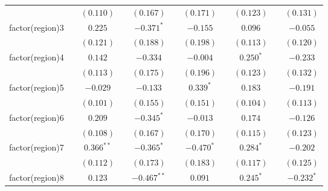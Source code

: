 \begin{tabular}{l c c c c c c c c c c}
                   &                & $(0.110)$      &                & $(0.167)$      &                & $(0.171)$      &                & $(0.123)$      &                & $(0.131)$      \\
factor(region)3    &                & $0.225$        &                & $-0.371^{*}$   &                & $-0.155$       &                & $0.096$        &                & $-0.055$       \\
                   &                & $(0.121)$      &                & $(0.188)$      &                & $(0.198)$      &                & $(0.113)$      &                & $(0.120)$      \\
factor(region)4    &                & $0.142$        &                & $-0.334$       &                & $-0.004$       &                & $0.250^{*}$    &                & $-0.233$       \\
                   &                & $(0.113)$      &                & $(0.175)$      &                & $(0.196)$      &                & $(0.123)$      &                & $(0.132)$      \\
factor(region)5    &                & $-0.029$       &                & $-0.133$       &                & $0.339^{*}$    &                & $0.183$        &                & $-0.191$       \\
                   &                & $(0.101)$      &                & $(0.155)$      &                & $(0.151)$      &                & $(0.104)$      &                & $(0.113)$      \\
factor(region)6    &                & $0.209$        &                & $-0.345^{*}$   &                & $-0.013$       &                & $0.174$        &                & $-0.126$       \\
                   &                & $(0.108)$      &                & $(0.167)$      &                & $(0.170)$      &                & $(0.115)$      &                & $(0.123)$      \\
factor(region)7    &                & $0.366^{**}$   &                & $-0.365^{*}$   &                & $-0.470^{*}$   &                & $0.284^{*}$    &                & $-0.202$       \\
                   &                & $(0.112)$      &                & $(0.173)$      &                & $(0.183)$      &                & $(0.117)$      &                & $(0.125)$      \\
factor(region)8    &                & $0.123$        &                & $-0.467^{**}$  &                & $0.091$        &                & $0.245^{*}$    &                & $-0.232^{*}$   \\

\end{tabular}
